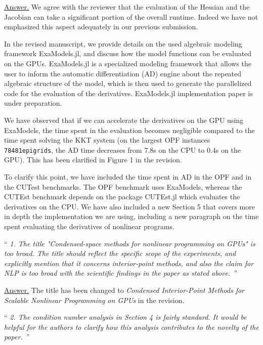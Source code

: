 \documentclass[10pt,a4paper]{article}
\newenvironment{quotereviewer}{\vspace{.5cm}{\underline\reviewername} ``\it\footnotesize}{''}
\newcommand{\answer}{\vspace{1mm}\underline{Answer.} }
\begin{document}
\answer
We agree with the reviewer that the evaluation of the Hessian and the Jacobian
can take a significant portion of the overall runtime.
Indeed we have not emphasized this aspect adequately in our previous submission.

In the revised manuscript, we provide details on the used algebraic modeling framework ExaModels.jl, and
discuss how the model functions can be evaluated on the GPUs.
ExaModels.jl is a specialized modeling framework that allows the user to inform the automatic differentiation (AD) engine
about the repeated algebraic structure of the model, which is then used to generate the parallelized code for the evaluation of the derivatives.
ExaModels.jl implementation paper is under preparation.

We have observed that if we can accelerate the derivatives on the GPU using ExaModels, the time spent in
the evaluation becomes negligible compared to the time spent solving the KKT
system (on the largest OPF instances {\tt 78481epigrids}, the AD time
decreases from 7.8s on the CPU to 0.4s on the GPU).
This has been clarified in Figure 1 in the revision.

To clarify this point, we have included the time spent in AD in the OPF
and in the CUTest benchmarks. The OPF benchmark uses ExaModels, whereas
the CUTEst benchmark depends on the package CUTEst.jl which evaluates the
derivatives on the CPU. We have also included a new Section 5 that covers more
in depth the implementation we are using, including a new paragraph on the time
spent evaluating the derivatives of nonlinear programs.



\begin{quotereviewer}
1. The title "Condensed-space methods for nonlinear programming on GPUs" is too broad.
The title should reﬂect the speciﬁc scope of the experiments, and explicitly mention that it
concerns interior-point methods, and also the claim for NLP is too broad with the scientiﬁc
ﬁndings in the paper as stated above.
\end{quotereviewer}

\answer
The title has been changed to \emph{Condensed Interior-Point Methods for Scalable Nonlinear Programming on GPUs}
in the revision.

\begin{quotereviewer}
2. The condition number analysis in Section 4 is fairly standard. It would be helpful for the
authors to clarify how this analysis contributes to the novelty of the paper.
\end{quotereviewer}
\end{document}
